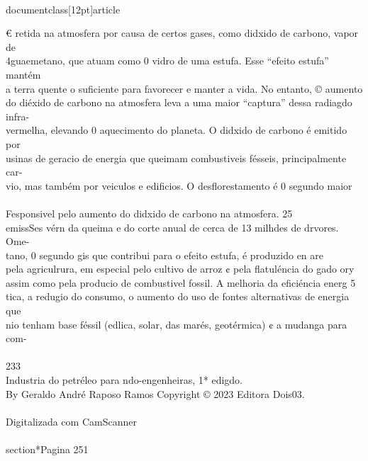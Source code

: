 \\documentclass[12pt]{article}
\begin{document}
€ retida na atmosfera por causa de certos gases, como didxido de carbono, vapor de\\
4guaemetano, que atuam como 0 vidro de uma estufa. Esse “efeito estufa” mantém\\
a terra quente o suficiente para favorecer e manter a vida. No entanto, © aumento\\
do diéxido de carbono na atmosfera leva a uma maior “captura” dessa radiagdo infra-\\
vermelha, elevando 0 aquecimento do planeta. O didxido de carbono é emitido por\\
usinas de geracio de energia que queimam combustiveis fésseis, principalmente car-\\
vio, mas também por veiculos e edificios. O desflorestamento é 0 segundo maior\\
\\
Fesponsivel pelo aumento do didxido de carbono na atmosfera. 25\\%
emissSes vérn da queima e do corte anual de cerca de 13 milhdes de drvores. Ome-\\
tano, 0 segundo gis que contribui para o efeito estufa, é produzido en are\\
pela agriculrura, em especial pelo cultivo de arroz ¢ pela flatuléncia do gado ory\\
assim como pela producio de combustivel fossil. A melhoria da eficiéncia energ 5\\
tica, a redugio do consumo, o aumento do uso de fontes alternativas de energia que\\
nio tenham base féssil (edlica, solar, das marés, geotérmica) ¢ a mudanga para com-\\
\\
233\\
Industria do petréleo para ndo-engenheiras, 1* edigdo.\\
By Geraldo André Raposo Ramos Copyright © 2023 Editora Dois03.\\
\\
Digitalizada com CamScanner\\

\\section*{Pagina 251}
\end{document}
